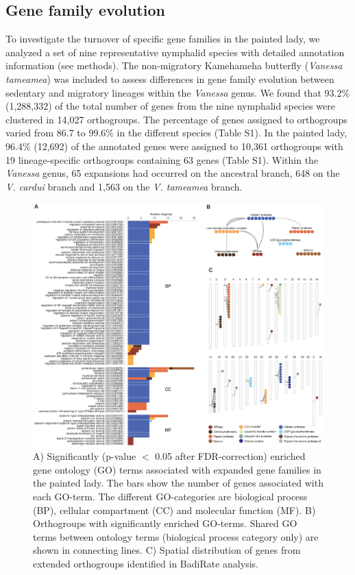 \documentclass[twocolumn]{bmcart}%
\begin{document}
\subsection*{Gene family evolution}
To investigate the turnover of specific gene families in the painted lady, we analyzed a set of nine representative nymphalid species with detailed annotation information (see methods). The non-migratory Kamehameha butterfly (\textit{Vanessa tameamea}) was included to assess differences in gene family evolution between sedentary and migratory lineages within the \textit{Vanessa} genus. We found that 93.2\% (1,288,332) of the total number of genes from the nine nymphalid species were clustered in 14,027 orthogroups. The percentage of genes assigned to orthogroups varied from 86.7 to 99.6\% in the different species (Table S1). In the painted lady, 96.4\% (12,692) of the annotated genes were assigned to 10,361 orthogroups with 19 lineage-specific orthogroups containing 63 genes (Table S1). Within the \textit{Vanessa} genus, 65 expansions had occurred on the ancestral branch, 648 on the \textit{V. cardui} branch and 1,563 on the \textit{V. tameamea} branch.

\begin{figure}[tb]
    \centering
    \includegraphics[width=1.99\linewidth]{ShipilinaNasvallFig3opt.eps}
    \caption{A) Significantly (p-value $<$ 0.05 after FDR-correction) enriched gene ontology (GO) terms associated with expanded gene families in the painted lady. The bars show the number of genes associated with each GO-term. The different GO-categories are biological process (BP), cellular compartment (CC) and molecular function (MF). B) Orthogroups with significantly enriched GO-terms. Shared GO terms between ontology terms (biological process category only) are shown in connecting lines. C) Spatial distribution of genes from extended orthogroups identified in BadiRate analysis.}
    \label{fig:3}
\end{figure}
\end{document}
